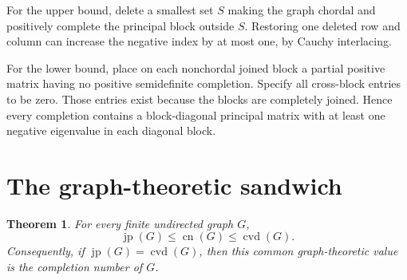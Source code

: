\documentclass[11pt]{amsart}
\newtheorem{theorem}{Theorem}
\newcommand{\cn}{\operatorname{cn}}
\newcommand{\cvd}{\operatorname{cvd}}
\newcommand{\jp}{\operatorname{jp}}
\begin{document}
For the upper bound, delete a smallest set $S$ making the graph chordal and
positively complete the principal block outside $S$.  Restoring one deleted
row and column can increase the negative index by at most one, by Cauchy
interlacing.

For the lower bound, place on each nonchordal joined block a partial positive
matrix having no positive semidefinite completion.  Specify all cross-block
entries to be zero.  Those entries exist because the blocks are completely
joined.  Hence every completion contains a block-diagonal principal matrix
with at least one negative eigenvalue in each diagonal block.

\section*{The graph-theoretic sandwich}

\begin{theorem}\label{thm:sandwich}
For every finite undirected graph $G$,
\[
 \boxed{\qquad \jp(G)\leq \cn(G)\leq \cvd(G).\qquad}
\]
Consequently, if $\jp(G)=\cvd(G)$, then this common graph-theoretic value is
the completion number of $G$.
\end{theorem}
\end{document}
